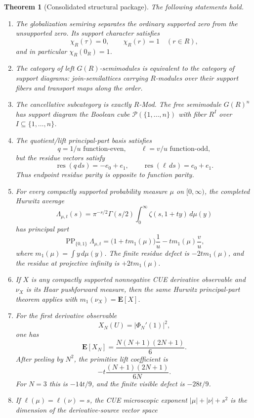 \documentclass[11pt]{article}
\newcommand{\PP}{\operatorname{PP}}
\theoremstyle{plain}
\newtheorem{theorem}{Theorem}[section]
\theoremstyle{definition}
\begin{document}
\begin{theorem}[Consolidated structural package]\label{thm:intro-package}
The following statements hold.
\begin{enumerate}[label=\textup{(\arabic*)}]
\item The globalization semiring separates the ordinary supported zero from the unsupported zero.  Its support character satisfies
\[
   \chi_R(\tau)=0,
   \qquad
   \chi_R(r)=1\quad(r\in R),
\]
and in particular \(\chi_R(0_R)=1\).
\item The category of left \(G(R)\)-semimodules is equivalent to the category of support diagrams: join-semilattices carrying \(R\)-modules over their support fibers and transport maps along the order.
\item The cancellative subcategory is exactly \(R\)-Mod.  The free semimodule \(G(R)^n\) has support diagram the Boolean cube \(\mathcal P(\{1,\ldots,n\})\) with fiber \(R^I\) over \(I\subseteq\{1,\ldots,n\}\).
\item The quotient/lift principal-part basis satisfies
\[
   q=1/u\text{ function-even},
   \qquad
   \ell=v/u\text{ function-odd},
\]
but the residue vectors satisfy
\[
   \operatorname{res}(q\,ds)=-e_0+e_1,
   \qquad
   \operatorname{res}(\ell\,ds)=e_0+e_1.
\]
Thus endpoint residue parity is opposite to function parity.
\item For every compactly supported probability measure \(\mu\) on \([0,\infty)\), the completed Hurwitz average
\[
   \Lambda_{\mu,t}(s)=\pi^{-s/2}\Gamma(s/2)\int_0^\infty \zeta(s,1+ty)\,d\mu(y)
\]
has principal part
\[
   \PP_{\{0,1\}}\Lambda_{\mu,t}
   =\bigl(1+t m_1(\mu)\bigr)\frac1u
     -t m_1(\mu)\frac vu,
\]
where \(m_1(\mu)=\int y\,d\mu(y)\).  The finite residue defect is \(-2t m_1(\mu)\), and the residue at projective infinity is \(+2t m_1(\mu)\).
\item If \(X\) is any compactly supported nonnegative CUE derivative observable and \(\nu_X\) is its Haar pushforward measure, then the same Hurwitz principal-part theorem applies with \(m_1(\nu_X)=\mathbf E[X]\).
\item For the first derivative observable
\[
   X_N(U)=|\Phi_N'(1)|^2,
\]
one has
\[
   \mathbf E[X_N]=\frac{N(N+1)(2N+1)}6.
\]
After peeling by \(N^2\), the primitive lift coefficient is
\[
   -t\frac{(N+1)(2N+1)}{6N}.
\]
For \(N=3\) this is \(-14t/9\), and the finite visible defect is \(-28t/9\).
\item If \(\ell(\mu)=\ell(\nu)=s\), the CUE microscopic exponent \(|\mu|+|\nu|+s^2\) is the dimension of the derivative-source vector space

\end{enumerate}
\end{theorem}
\end{document}
